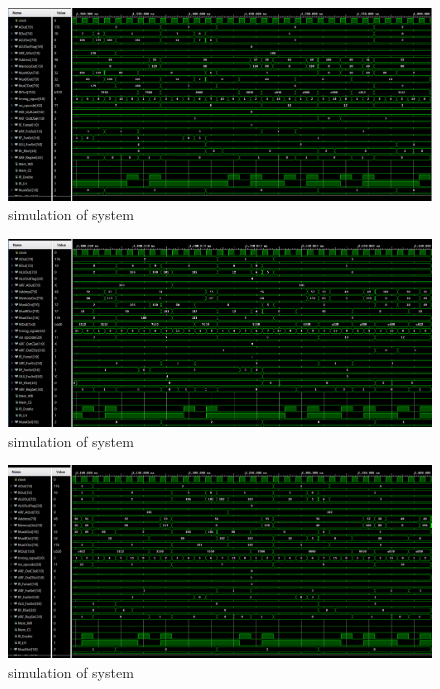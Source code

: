 \documentclass[pdftex,12pt,a4paper]{article}
\begin{document}
\begin{figure}[H]
    \centering
    \includegraphics[width=1\textwidth]{photos/system_result_6.png}	
    \caption{simulation of system}
    \label{implementation}
\end{figure}


\begin{figure}[H]
    \centering
    \includegraphics[width=1\textwidth]{photos/system_result_7.png}	
    \caption{simulation of system}
    \label{implementation}
\end{figure}

\begin{figure}[H]
    \centering
    \includegraphics[width=1\textwidth]{photos/system_result_8.png}	
    \caption{simulation of system}
    \label{implementation}
\end{figure}
\end{document}

